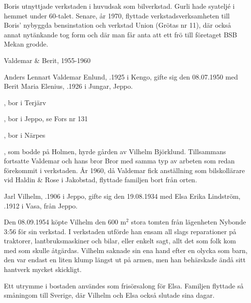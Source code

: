 Boris utnyttjade verkstaden i huvudsak som bilverkstad. Gurli hade syateljé i hemmet under 60-talet. Senare, år 1970, flyttade verkstadsverksamheten till Boris' nybyggda bensinstation och verkstad Union (Grötas nr 11), där också annat nytänkande tog form och där man får anta att ett frö till företaget BSB Mekan grodde.



 Valdemar \& Berit, 1955-1960

Anders Lennart Valdemar Enlund, .1925 i Kengo, gifte sig den 08.07.1950 med Berit Maria Elenius, .1926 i Jungar, Jeppo.
\begin{jhchildren}
  \item {}, bor i Terjärv
  \item {}, bor i Jeppo, se Fors nr 131
  \item {}, bor i Närpes
\end{jhchildren}
, som bodde på Holmen, hyrde gården av Vilhelm Björklund. Tillsammans fortsatte Valdemar och hans bror Bror med samma typ av arbeten som redan förekommit i verkstaden. År 1960, då Valdemar fick anställning som bilskollärare vid Haldin \& Rose i Jakobstad, flyttade familjen bort från orten.


Jarl Vilhelm, .1906 i Jeppo, gifte sig den 19.08.1934 med Elsa Erika Lindström, .1912 i Vasa, från Jeppo.
\begin{jhchildren}
  \item {}
  \item {}
\end{jhchildren}

Den 08.09.1954 köpte Vilhelm den 600 m$^2$ stora tomten från lägenheten Nybonde 3:56 för sin verkstad. I verkstaden utförde han ensam all slags reparationer på traktorer, lantbruksmaskiner och bilar, eller enkelt sagt, allt det som folk kom med som skulle åtgärdas. Vilhelm saknade sin ena hand efter en olycka som barn, den var endast en liten klump längst ut på armen, men han behärskade ändå sitt hantverk mycket skickligt.

Ett utrymme i bostaden användes som frisörsalong för Elsa. Familjen flyttade så småningom till Sverige, där Vilhelm och Elsa också slutade sina dagar.


